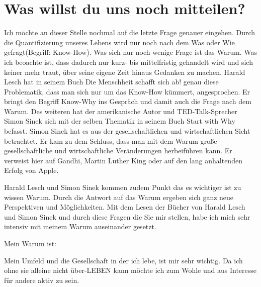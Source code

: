 \documentclass[12pt]{scrreprt}
\begin{document}
\section*{Was willst du uns noch mitteilen?}
\color{red}
Ich möchte an dieser Stelle nochmal auf die letzte Frage genauer eingehen. 
Durch die Quantifizierung unseres Lebens wird nur noch nach dem \glqq Was\grqq{} oder \glqq Wie\grqq{} gefragt(Begriff: \glqq Know-How\grqq{}).
Was sich nur noch wenige Frage ist das \glqq Warum\grqq{}.
Was ich beoachte ist, dass dadurch nur kurz- bis mittelfristig gehandelt wird und sich keiner mehr traut, über seine eigene Zeit hinaus Gedanken zu machen.
Harald Lesch hat in seinem Buch \glqq Die Menschheit schafft sich ab!\grqq{} genau diese Problematik, dass man sich nur um das Know-How 
kümmert, angesprochen. Er bringt den Begriff \glqq Know-Why\grqq{} ins Gespräch und damit auch die Frage nach dem \glqq Warum\grqq{}.
Des weiteren hat der amerikanische Autor und TED-Talk-Sprecher Simon Sinek sich mit der selben Thematik in seinem 
Buch \glqq Start with Why\grqq{} befasst. Simon Sinek hat es aus der gesellschaftlichen und wirtschaftlichen Sicht betrachtet. 
Er kam zu dem Schluss, dass man mit dem \glqq Warum\grqq{} große gesellschaftliche und wirtschaftliche Veränderungen herbeiführen kann. 
Er verweist hier auf Gandhi, Martin Luther King oder auf den lang anhaltenden Erfolg von Apple. 

Harald Lesch und Simon Sinek kommen zudem Punkt das es wichtiger ist zu wissen \glqq Warum\grqq{}. 
Durch die Antwort auf das \glqq Warum\grqq{} ergeben sich ganz neue Perspektiven und Möglichkeiten. 
Mit dem Lesen der Bücher von Harald Lesch und Simon Sinek und durch diese Fragen die Sie mir stellen, habe ich mich sehr intensiv 
mit meinem Warum auseinander gesetzt. 

Mein \glqq Warum\grqq{} ist:

Mein Umfeld und die Gesellschaft in der ich lebe, ist mir sehr wichtig. Da ich ohne sie alleine nicht über-LEBEN kann möchte ich zum 
Wohle und aus Interesse für andere aktiv zu sein.
\end{document}
